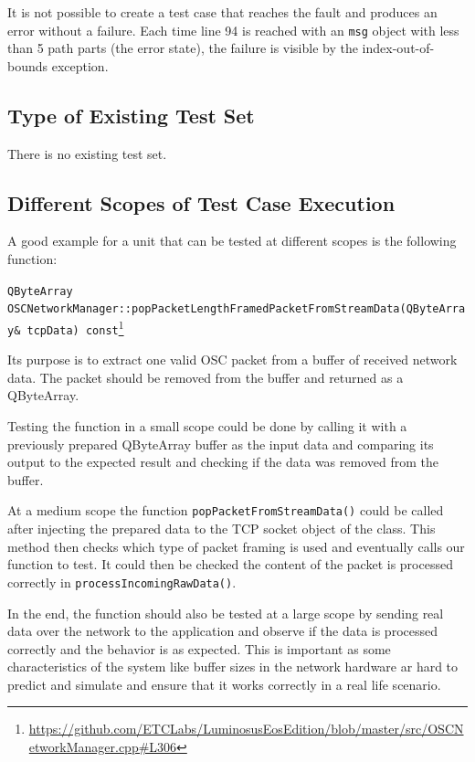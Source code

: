 \documentclass{scrreprt}
\begin{document}
It is not possible to create a test case that reaches the fault and produces an error without a failure. Each time line 94 is reached with an \texttt{msg} object with less than 5 path parts (the error state), the failure is visible by the index-out-of-bounds exception.

\subsection{Type of Existing Test Set}

There is no existing test set.

\subsection{Different Scopes of Test Case Execution}

A good example for a unit that can be tested at different scopes is the following function:

\texttt{QByteArray OSCNetworkManager::popPacketLengthFramedPacketFromStreamData(QByteArray\& tcpData) const}\footnote{\url{https://github.com/ETCLabs/LuminosusEosEdition/blob/master/src/OSCNetworkManager.cpp\#L306}}

Its purpose is to extract one valid OSC packet from a buffer of received network data. The packet should be removed from the buffer and returned as a QByteArray.

Testing the function in a small scope could be done by calling it with a previously prepared QByteArray buffer as the input data and comparing its output to the expected result and checking if the data was removed from the buffer.

At a medium scope the function \texttt{popPacketFromStreamData()} could be called after injecting the prepared data to the TCP socket object of the class. This method then checks which type of packet framing is used and eventually calls our function to test. It could then be checked the content of the packet is processed correctly in \texttt{processIncomingRawData()}.

In the end, the function should also be tested at a large scope by sending real data over the network to the application and observe if the data is processed correctly and the behavior is as expected. This is important as some characteristics of the system like buffer sizes in the network hardware ar hard to predict and simulate and ensure that it works correctly in a real life scenario.
\end{document}
